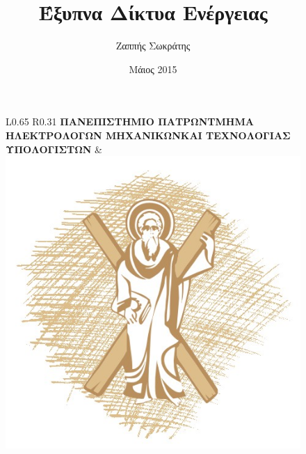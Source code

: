 \documentclass[12pt, a4paper, oneside]{report}
\title{Έξυπνα Δίκτυα Ενέργειας}
\author{Ζαππής Σωκράτης}
\date{Μάιος 2015}
\begin{document}

\begin{figure}[t]
\begin{tabular}{ L{0.65\textwidth} R{0.31\textwidth }}
\textbf{{\large ΠΑΝΕΠΙΣΤΗΜΙΟ ΠΑΤΡΩΝ}\newline ΤΜΗΜΑ ΗΛΕΚΤΡΟΛΟΓΩΝ ΜΗΧΑΝΙΚΩΝ\newline ΚΑΙ ΤΕΧΝΟΛΟΓΙΑΣ ΥΠΟΛΟΓΙΣΤΩΝ}
&
\includegraphics[scale=0.3]{uni_logo}  \\
\bottomrule
\end{tabular}
\end{figure}
\end{document}
